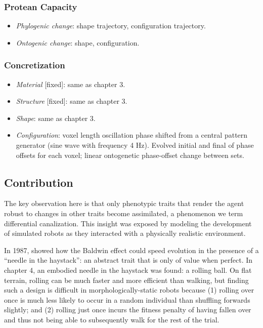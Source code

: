 \subsubsection*{Protean Capacity}

\begin{itemize}
    \item \textit{Phylogenic change}: shape trajectory, configuration trajectory.
    \item \textit{Ontogenic change}: shape, configuration.
\end{itemize}


\subsubsection*{Concretization}

\begin{itemize}
    \item \textit{Material} [fixed]: same as chapter 3.
    \item \textit{Structure} [fixed]: same as chapter 3.
    \item \textit{Shape}: same as chapter 3.
    \item \textit{Configuration}: voxel length oscillation phase shifted from a central pattern generator (sine wave with frequency 4 Hz).
    Evolved initial and final of phase offsets for each voxel; linear ontogenetic phase-offset change between sets.
\end{itemize}




\subsection{Contribution}


The key observation here is that only phenotypic traits that render the agent robust to changes in other traits become assimilated, a phenomenon we term differential canalization. 
This insight was exposed by modeling the development of simulated robots as they interacted with a physically realistic environment.

In 1987,
\citet{hinton1987learning} showed how the Baldwin effect could speed evolution in the presence of a ``needle in the haystack'': an abstract trait that is only of value when perfect.
In chapter 4,
an embodied needle in the haystack was found: a rolling ball.
On flat terrain, rolling can be much faster and more efficient than walking, but finding such a design is difficult in morphologically-static robots because (1) rolling over once is much less likely to occur in a random individual than shuffling forwards slightly; 
and (2) 
rolling just once incurs the fitness penalty of having fallen over and thus not being able to subsequently walk for the rest of the trial. 
 
